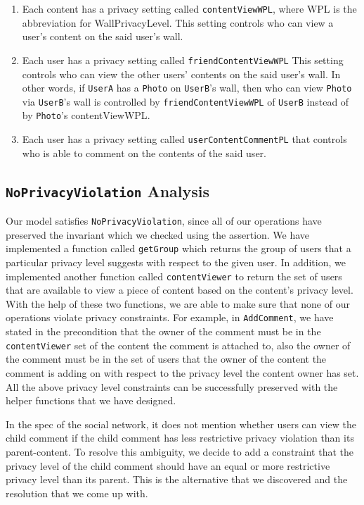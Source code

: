 \documentclass[titlepage]{article}
\begin{document}
\begin{enumerate}
    \item Each content has a privacy setting called \texttt{contentViewWPL}, where WPL is the abbreviation for WallPrivacyLevel. This setting controls who can view a user's content on the said user's wall.
    \item Each user has a privacy setting called \texttt{friendContentViewWPL} This setting controls who can view the other users' contents on the said user's wall. In other words, if \texttt{UserA} has a \texttt{Photo} on \texttt{UserB}'s wall, then who can view \texttt{Photo} via \texttt{UserB}'s wall is controlled by \texttt{friendContentViewWPL} of \texttt{UserB} instead of by \texttt{Photo}'s {contentViewWPL}.
    \item Each user has a privacy setting called \texttt{userContentCommentPL} that controls who is able to comment on the contents of the said user.
\end{enumerate}

\subsection{\texttt{NoPrivacyViolation} Analysis}
Our model satisfies \texttt{NoPrivacyViolation}, since all of our operations have preserved the invariant which we checked using the assertion. We have implemented a function called \texttt{getGroup} which returns the group of users that a particular privacy level suggests with respect to the given user. In addition, we implemented another function called \texttt{contentViewer} to return the set of users that are available to view a piece of content based on the content's privacy level. With the help of these two functions, we are able to make sure that none of our operations violate privacy constraints. For example, in \texttt{AddComment}, we have stated in the precondition that the owner of the comment must be in the \texttt{contentViewer} set of the content the comment is attached to, also the owner of the comment must be in the set of users that the owner of the content the comment is adding on with respect to the privacy level the content owner has set. All the above privacy level constraints can be successfully preserved with the helper functions that we have designed.

In the spec of the social network, it does not mention whether users can view the child comment if the child comment has less restrictive privacy violation than its parent-content. To resolve this ambiguity, we decide to add a constraint that the privacy level of the child comment should have an equal or more restrictive privacy level than its parent. This is the alternative that we discovered and the resolution that we come up with.
\end{document}
